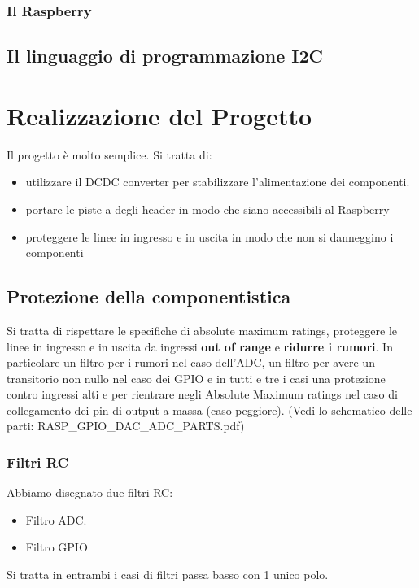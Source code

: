\documentclass[10pt]{article}
\begin{document}
		\subsubsection{Il Raspberry}

	\subsection{Il linguaggio di programmazione I2C}

\section{Realizzazione del Progetto}
		Il progetto è molto semplice. Si tratta di:
		\begin{itemize}
		        \item utilizzare il DCDC converter per stabilizzare l'alimentazione dei componenti.
		        \item portare le piste a degli header in modo che siano accessibili al Raspberry
		        \item proteggere le linee in ingresso e in uscita in modo che non si danneggino i componenti
		\end{itemize}

	\subsection{Protezione della componentistica}
		Si tratta di rispettare le specifiche di absolute maximum ratings, proteggere le linee in ingresso e in uscita da ingressi \textbf{out of range} e \textbf{ridurre i rumori}.
		In particolare un filtro per i rumori nel caso dell'ADC, un filtro per avere un transitorio non nullo nel caso dei GPIO e in tutti e tre i casi una protezione contro ingressi alti e per rientrare negli Absolute Maximum ratings nel caso di collegamento dei pin di output a massa (caso peggiore).
		(Vedi lo schematico delle parti: RASP\_GPIO\_DAC\_ADC\_PARTS.pdf)
		\subsubsection{Filtri RC}
		Abbiamo disegnato due filtri RC:
		\begin{itemize}
		        \item Filtro ADC.
		        \item Filtro GPIO
		\end{itemize}
		Si tratta in entrambi i casi di filtri passa basso con 1 unico polo.
\end{document}
